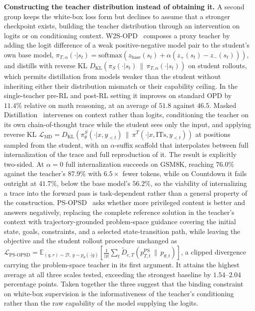 \documentclass{article} %
\newcommand{\E}{\mathbb{E}}
\newcommand{\KL}{D_{\mathrm{KL}}}
\newcommand{\loss}{\mathcal{L}}
\begin{document}
\textbf{Constructing the teacher distribution instead of obtaining it.} A second group keeps the white-box loss form but declines to assume that a stronger checkpoint exists, building the teacher distribution through an intervention on logits or on conditioning context. W2S-OPD~\citep{2607.26246} composes a proxy teacher by adding the logit difference of a weak positive-negative model pair to the student's own base model, $\pi_{T,\alpha}(\cdot|s_t) = \mathrm{softmax}(z_{\text{base}}(s_t) + \alpha(z_+(s_t) - z_-(s_t)))$, and distills with reverse KL $\KL(\pi_S(\cdot|s_t) \,\|\, \pi_{T,\alpha}(\cdot|s_t))$ on student rollouts, which permits distillation from models weaker than the student without inheriting either their distribution mismatch or their capability ceiling. In the single-teacher pre-RL and post-RL setting it improves on standard OPD by $11.4\%$ relative on math reasoning, at an average of $51.8$ against $46.5$. Masked Distillation~\citep{2607.22629} intervenes on context rather than logits, conditioning the teacher on its own chain-of-thought trace while the student sees only the input, and applying reverse KL $\loss_{\text{MD}} = \KL(\pi^S_\theta(\cdot|x, y_{<t}) \,\|\, \pi^T(\cdot|x, \mathrm{ITs}, y_{<t}))$ at positions sampled from the student, with an $\alpha$-suffix scaffold that interpolates between full internalization of the trace and full reproduction of it. The result is explicitly two-sided. At $\alpha = 0$ full internalization succeeds on GSM8K, reaching $76.0\%$ against the teacher's $87.9\%$ with $6.5\times$ fewer tokens, while on Countdown it fails outright at $41.7\%$, below the base model's $56.2\%$, so the viability of internalizing a trace into the forward pass is task-dependent rather than a general property of the construction. PS-OPSD~\citep{2608.01589} asks whether more privileged content is better and answers negatively, replacing the complete reference solution in the teacher's context with trajectory-grounded problem-space guidance covering the initial state, goals, constraints, and a selected state-transition path, while leaving the objective and the student rollout procedure unchanged as $\loss_{\text{PS-OPSD}} = \E_{(q,r) \sim \mathcal{D},\, y \sim p_\theta(\cdot|q)}[\frac{1}{|y|}\sum_t \tilde{D}_{c,T}(p^{\text{PS}}_{T,t} \,\|\, p_{\theta,t})]$, a clipped divergence carrying the problem-space teacher in its first argument. It attains the highest average at all three scales tested, exceeding the strongest baseline by $1.54$--$2.04$ percentage points. Taken together the three suggest that the binding constraint on white-box supervision is the informativeness of the teacher's conditioning rather than the raw capability of the model supplying the logits.
\end{document}
